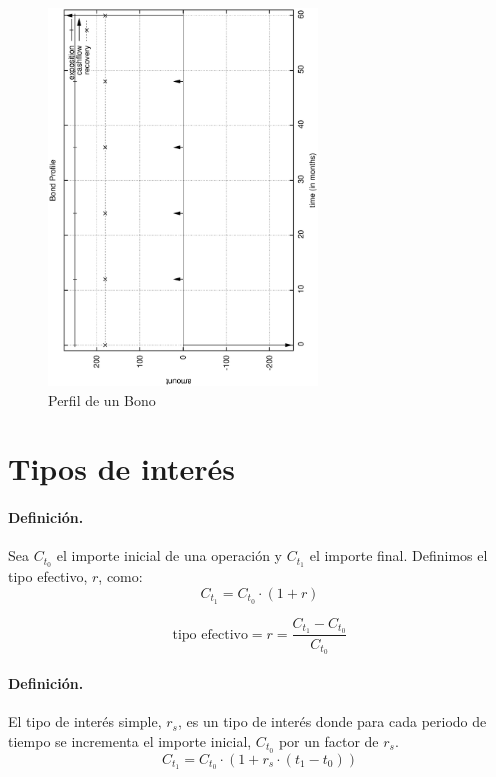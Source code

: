 \begin{figure}[!hb]
\begin{center}
\includegraphics[height=10cm, angle=-90]{./images/bond.ps}
\caption{Perfil de un Bono}
\label{bond}
\end{center}
\end{figure}


\section{Tipos de inter\'es}
\label{sec:interests}

\paragraph{Definici\'on.}
Sea $C_{t_0}$ el importe inicial de una operaci\'on y $C_{t_1}$ el importe final. 
Definimos el tipo efectivo, $r$, como:
\begin{equation}
C_{t_1} = C_{t_0} \cdot (1+r)
\end{equation}

\begin{equation}
\label{tipus_efectiu}
\textrm{tipo efectivo} = r = \frac{C_{t_1}-C_{t_0}}{C_{t_0}}
\end{equation}

\paragraph{Definici\'on.}
El tipo de inter\'es simple, $r_s$, es un tipo de inter\'es donde para cada 
periodo de tiempo se incrementa el importe inicial, $C_{t_0}$ por un factor de $r_s$. 
\begin{equation}
C_{t_1} = C_{t_0} \cdot (1+ r_s \cdot (t_1-t_0))
\end{equation}

